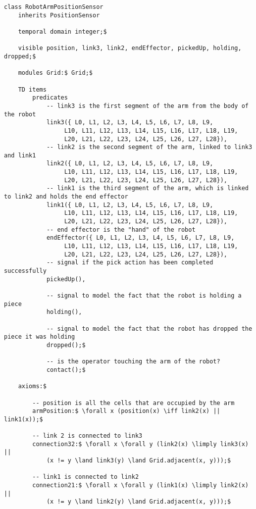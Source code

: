 \begin{lstlisting}[fontadjust, mathescape, frame=tlb] 
class RobotArmPositionSensor
    inherits PositionSensor

    temporal domain integer;$

    visible position, link3, link2, endEffector, pickedUp, holding, dropped;$

    modules Grid:$ Grid;$

    TD items
        predicates
            -- link3 is the first segment of the arm from the body of the robot
            link3({ L0, L1, L2, L3, L4, L5, L6, L7, L8, L9,
                 L10, L11, L12, L13, L14, L15, L16, L17, L18, L19,
                 L20, L21, L22, L23, L24, L25, L26, L27, L28}),
            -- link2 is the second segment of the arm, linked to link3 and link1
            link2({ L0, L1, L2, L3, L4, L5, L6, L7, L8, L9,
                 L10, L11, L12, L13, L14, L15, L16, L17, L18, L19,
                 L20, L21, L22, L23, L24, L25, L26, L27, L28}),
            -- link1 is the third segment of the arm, which is linked to link2 and holds the end effector
            link1({ L0, L1, L2, L3, L4, L5, L6, L7, L8, L9,
                 L10, L11, L12, L13, L14, L15, L16, L17, L18, L19,
                 L20, L21, L22, L23, L24, L25, L26, L27, L28}),
            -- end effector is the "hand" of the robot
            endEffector({ L0, L1, L2, L3, L4, L5, L6, L7, L8, L9,
                 L10, L11, L12, L13, L14, L15, L16, L17, L18, L19,
                 L20, L21, L22, L23, L24, L25, L26, L27, L28}),
            -- signal if the pick action has been completed successfully
            pickedUp(),

            -- signal to model the fact that the robot is holding a piece
            holding(),

            -- signal to model the fact that the robot has dropped the piece it was holding
            dropped();$

            -- is the operator touching the arm of the robot?
            contact();$

    axioms:$

        -- position is all the cells that are occupied by the arm
        armPosition:$ \forall x (position(x) \iff link2(x) || link1(x));$
        
        -- link 2 is connected to link3
        connection32:$ \forall x \forall y (link2(x) \limply link3(x) ||
            (x != y \land link3(y) \land Grid.adjacent(x, y)));$

        -- link1 is connected to link2
        connection21:$ \forall x \forall y (link1(x) \limply link2(x) ||
            (x != y \land link2(y) \land Grid.adjacent(x, y)));$


\end{lstlisting}
